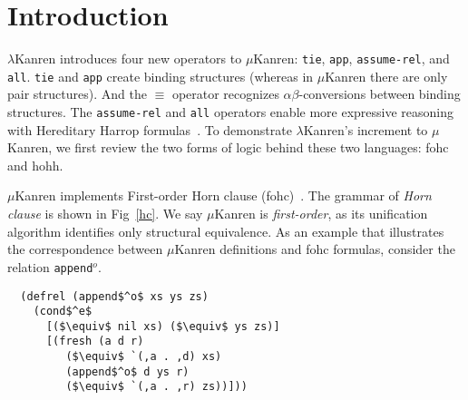\documentclass[acmlarge,review]{acmart}
\theoremstyle{definition}
\begin{document}



\maketitle

\section{Introduction}

$\lambda$Kanren introduces four new operators to
$\mu$Kanren\citep{hemann_kanren:_2013}: \texttt{tie}, \texttt{app},
\texttt{assume-rel}, and \texttt{all}. \texttt{tie} and \texttt{app} create
binding structures (whereas in $\mu$Kanren there are only pair structures).
And the $\equiv$ operator recognizes $\alpha\beta$-conversions
between binding structures. The \texttt{assume-rel} and \texttt{all} operators
enable more expressive reasoning with Hereditary Harrop
formulas~\citep{miller_hereditary_1987}.
To demonstrate $\lambda$Kanren's increment to $\mu$Kanren, we first
review the two forms of logic behind these two languages: fohc and hohh.

$\mu$Kanren implements First-order
Horn clause (fohc)~\citep{apt_contributions_1982}. The grammar of \emph{Horn clause}
is shown in Fig~\ref{hc}. We say $\mu$Kanren is \emph{first-order}, as its
unification algorithm identifies only
structural equivalence. As an example that illustrates the correspondence
between $\mu$Kanren definitions and fohc formulas,
consider the relation \texttt{append$^o$}.

\begin{lstlisting}
  (defrel (append$^o$ xs ys zs)
    (cond$^e$
      [($\equiv$ nil xs) ($\equiv$ ys zs)]
      [(fresh (a d r)
         ($\equiv$ `(,a . ,d) xs)
         (append$^o$ d ys r)
         ($\equiv$ `(,a . ,r) zs))]))
\end{lstlisting}
\end{document}
